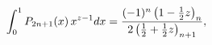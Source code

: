 \[\int_{0}^{1}\mathop{P_{2n+1}\/}\nolimits\!\left(x\right)x^{z-1}dx=\frac{(-1)^{%
n}\left(1-\frac{1}{2}z\right)_{n}}{2\left(\frac{1}{2}+\frac{1}{2}z\right)_{n+1%
}},\]